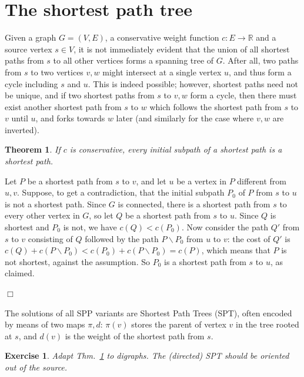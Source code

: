 \documentclass[a4paper]{book}
\theoremstyle{changebreak}                %
\newtheorem{thm}[result]{Theorem}
\newtheorem{ex}[result]{Exercise}
\newenvironment{proof}
 {{\sl Proof.}\hspace*{1 ex}}%
 {{\nopagebreak\hspace*{\fill}$\Box$\par\vspace{12pt}}}
\begin{document}
\section{The shortest path tree}
Given a graph $G=(V,E)$, a conservative weight function
$c:E\to\mathbb{R}$ and a source vertex $s\in V$,
it is not immediately evident that the union of all shortest
paths from $s$ to all other vertices forms a
spanning tree of $G$. After all, two paths from
$s$ to two vertices $v,w$ might intersect at a single vertex $u$, and
thus form a cycle including $s$ and $u$. This is indeed
possible; however, shortest paths need not be unique, and if two shortest paths from $s$ to $v,w$ form a cycle,
then there must exist another shortest path from $s$ to $w$ which
follows the shortest path from $s$ to $v$ until $u$, and forks towards
$w$ later (and similarly for the case where $v,w$ are inverted).

\begin{thm}
If $c$ is conservative, every initial
subpath of a shortest path is a shortest path.
\label{thm:path}
\end{thm}
\begin{proof}
Let $P$ be a shortest path from $s$ to $v$, and let $u$ be a
vertex in $P$ different from $u,v$. Suppose, to get a
contradiction, that the initial subpath $P_0$ of $P$ from $s$ to $u$
is not a shortest path. Since $G$ is connected,
there is a shortest path from $s$ to every other vertex in $G$, so let
$Q$ be a shortest path from $s$ to $u$. Since $Q$ is shortest and
$P_0$ is not, we have $c(Q)<c(P_0)$. Now consider the path $Q'$ from
$s$ to $v$ consisting of $Q$ followed by the path $P\smallsetminus
P_0$ from $u$ to $v$: the cost of $Q'$ is $c(Q)+c(P\smallsetminus
P_0)<c(P_0)+c(P\smallsetminus P_0)=c(P)$, which means that $P$ is not
shortest, against the assumption. So $P_0$ is a shortest path from $s$
to $u$, as claimed.
\end{proof}
The solutions of all SPP variants are Shortest Path Trees
(SPT), often encoded by means of two maps $\pi,d$: $\pi(v)$
stores the parent of vertex $v$ in the tree
rooted at $s$, and $d(v)$ is the weight of the shortest path from $s$.

\begin{ex}
Adapt Thm.~\ref{thm:path} to digraphs. The (directed)
SPT should  be oriented
out of the source.
\end{ex}
\end{document}
